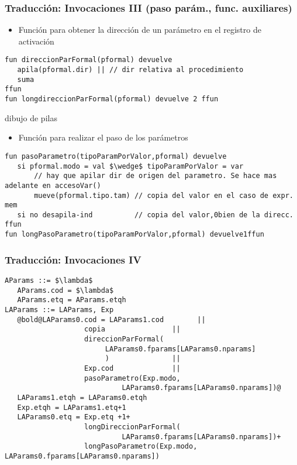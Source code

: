 \documentclass[hyperref={pdfpagelabels=false},tree-dvips,compress]{beamer}
\begin{document}
\begin{frame}[fragile]
\frametitle{Traducción: Invocaciones III (paso parám., func. auxiliares)}

\begin{itemize}
	\item Función para obtener la dirección de un parámetro en el registro de activación
\end{itemize}

\begin{lstlisting}[style=codigoMP,basicstyle=\scriptsize\ttfamily,mathescape]
fun direccionParFormal(pformal) devuelve
   apila(pformal.dir) || // dir relativa al procedimiento
   suma
ffun
fun longdireccionParFormal(pformal) devuelve 2 ffun
\end{lstlisting}

dibujo de pilas

\begin{itemize}
	\item Función para realizar el paso de los parámetros
\end{itemize}

\begin{lstlisting}[style=codigoMP,basicstyle=\scriptsize\ttfamily,mathescape]
fun pasoParametro(tipoParamPorValor,pformal) devuelve
   si pformal.modo = val $\wedge$ tipoParamPorValor = var
       // hay que apilar dir de origen del parametro. Se hace mas adelante en accesoVar()
       mueve(pformal.tipo.tam) // copia del valor en el caso de expr. mem
   si no desapila-ind          // copia del valor,0bien de la direcc.
ffun
fun longPasoParametro(tipoParamPorValor,pformal) devuelve1ffun
\end{lstlisting}

\end{frame}
\begin{frame}[fragile]
\frametitle{Traducción: Invocaciones IV}

\begin{lstlisting}[style=gramaticas,basicstyle=\scriptsize\ttfamily,mathescape]
AParams ::= $\lambda$
   AParams.cod = $\lambda$
   AParams.etq = AParams.etqh
LAParams ::= LAParams, Exp
   @bold@LAParams0.cod = LAParams1.cod        ||
                   copia                ||
                   direccionParFormal(
                   	    LAParams0.fparams[LAParams0.nparams]
                   	    )               ||
                   Exp.cod              ||
                   pasoParametro(Exp.modo,
                            LAParams0.fparams[LAParams0.nparams])@
   LAParams1.etqh = LAParams0.etqh
   Exp.etqh = LAParams1.etq+1
   LAParams0.etq = Exp.etq +1+
                   longDireccionParFormal(
                   	        LAParams0.fparams[LAParams0.nparams])+
                   longPasoParametro(Exp.modo, LAParams0.fparams[LAParams0.nparams])
\end{lstlisting}

\end{frame}
\end{document}

